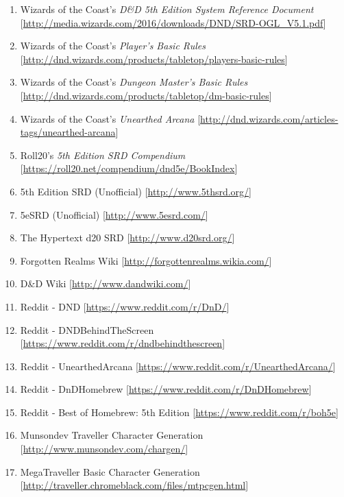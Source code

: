 \documentclass[10pt,twoside]{article}
\begin{document}
\begin{multicols}{2}

\begin{enumerate}

\item Wizards of the Coast's \textit{D\&D 5th Edition System Reference Document} [\url{http://media.wizards.com/2016/downloads/DND/SRD-OGL_V5.1.pdf}]

\item Wizards of the Coast's \textit{Player's Basic Rules} [\url{http://dnd.wizards.com/products/tabletop/players-basic-rules}]

\item Wizards of the Coast's \textit{Dungeon Master's Basic Rules} [\url{http://dnd.wizards.com/products/tabletop/dm-basic-rules}]

\item Wizards of the Coast's \textit{Unearthed Arcana} [\url{http://dnd.wizards.com/articles-tags/unearthed-arcana}]

\item Roll20's \textit{5th Edition SRD Compendium} [\url{https://roll20.net/compendium/dnd5e/BookIndex}]

\item 5th Edition SRD (Unofficial) [\url{http://www.5thsrd.org/}]

\item 5eSRD (Unofficial) [\url{http://www.5esrd.com/}]

\item The Hypertext d20 SRD [\url{http://www.d20srd.org/}]

\item Forgotten Realms Wiki [\url{http://forgottenrealms.wikia.com/}]

\item D\&D Wiki [\url{http://www.dandwiki.com/}]

\item Reddit - DND [\url{https://www.reddit.com/r/DnD/}]

\item Reddit - DNDBehindTheScreen [\url{https://www.reddit.com/r/dndbehindthescreen}]

\item Reddit - UnearthedArcana [\url{https://www.reddit.com/r/UnearthedArcana/}]

\item Reddit - DnDHomebrew [\url{https://www.reddit.com/r/DnDHomebrew}]

\item Reddit - Best of Homebrew: 5th Edition [\url{https://www.reddit.com/r/boh5e}]

\item Munsondev Traveller Character Generation [\url{http://www.munsondev.com/chargen/}]

\item MegaTraveller Basic Character Generation [\url{http://traveller.chromeblack.com/files/mtpcgen.html}]

\end{enumerate}

\end{multicols}

\end{document}
